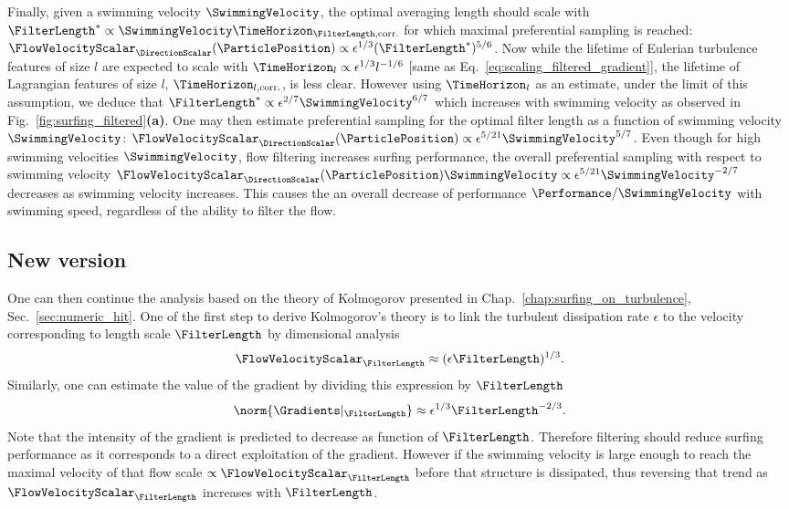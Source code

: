Finally, given a swimming velocity $\SwimmingVelocity$, the optimal averaging length should scale with $\FilterLength^* \propto \SwimmingVelocity \TimeHorizon_{\FilterLength,\mathrm{corr.}}$ for which maximal preferential sampling is reached: $\FlowVelocityScalar_{\DirectionScalar} (\ParticlePosition) \propto \epsilon^{1/3}  (\FilterLength^*)^{5/6}$.
Now while the lifetime of Eulerian turbulence features of size $l$ are expected to scale with $\TimeHorizon_l \propto \epsilon^{1/3}  l^{-1/6}$ [same as Eq.~\eqref{eq:scaling_filtered_gradient}], the lifetime of Lagrangian features of size $l$, $\TimeHorizon_{l,\mathrm{corr.}}$, is less clear.
However using $\TimeHorizon_l$ as an estimate, under the limit of this assumption, we deduce that $\FilterLength^* \propto \epsilon^{2/7} \SwimmingVelocity^{6/7}$ which increases with swimming velocity as observed in Fig.~\ref{fig:surfing_filtered}\textbf{(a)}.
One may then estimate preferential sampling for the optimal filter length as a function of swimming velocity $\SwimmingVelocity$: $\FlowVelocityScalar_{\DirectionScalar} (\ParticlePosition) \propto \epsilon^{5/21} \SwimmingVelocity^{5/7}$.
Even though for high swimming velocities $\SwimmingVelocity$, flow filtering increases surfing performance, the overall preferential sampling with respect to swimming velocity $\FlowVelocityScalar_{\DirectionScalar} (\ParticlePosition) \SwimmingVelocity \propto \epsilon^{5/21} \SwimmingVelocity^{-2/7}$ decreases as swimming velocity increases.
This causes the an overall decrease of performance $\Performance / \SwimmingVelocity$ with swimming speed, regardless of the ability to filter the flow.

\subsection{New version}

One can then continue the analysis based on the theory of Kolmogorov presented in Chap.~\ref{chap:surfing_on_turbulence}, Sec.~\ref{sec:numeric_hit}.
One of the first step to derive Kolmogorov's theory is to link the turbulent dissipation rate $\epsilon$ to the velocity corresponding to length scale $\FilterLength$ by dimensional analysis
\begin{equation}
	\FlowVelocityScalar_\FilterLength \approx (\epsilon \FilterLength)^{1/3}.
\end{equation}
Similarly, one can estimate the value of the gradient by dividing this expression by $\FilterLength$
\begin{equation}
	\norm{\Gradients|_\FilterLength} \approx \epsilon^{1/3} \FilterLength^{-2/3}.
\end{equation}
Note that the intensity of the gradient is predicted to decrease as function of $\FilterLength$.
Therefore filtering should reduce surfing performance as it corresponds to a direct exploitation of the gradient.
However if the swimming velocity is large enough to reach the maximal velocity of that flow scale $\propto \FlowVelocityScalar_\FilterLength$ before that structure is dissipated, thus reversing that trend as $\FlowVelocityScalar_\FilterLength$ increases with $\FilterLength$.


